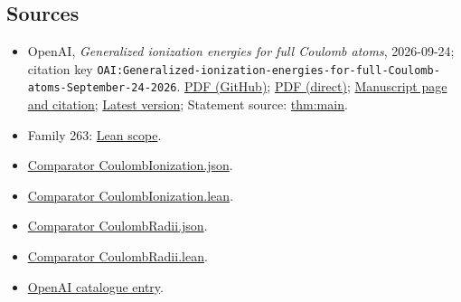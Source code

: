 \documentclass[11pt]{article}
\begin{document}
\subsection{Sources}
\begin{itemize}
\item OpenAI, \emph{Generalized ionization energies for full Coulomb atoms}, 2026-09-24; citation key \texttt{OAI:Generalized-ionization-energies-for-full-Coulomb-atoms-September-24-2026}. \href{https://github.com/openai/math/blob/adc7f1241b42e322a6451854ab7e4b4c146bf78a/preprints/Generalized-ionization-energies-for-full-Coulomb-atoms-September-24-2026/paper.pdf}{PDF (GitHub)}; \href{https://github.com/openai/math/raw/adc7f1241b42e322a6451854ab7e4b4c146bf78a/preprints/Generalized-ionization-energies-for-full-Coulomb-atoms-September-24-2026/paper.pdf}{PDF (direct)}; \href{https://github.com/openai/math/blob/adc7f1241b42e322a6451854ab7e4b4c146bf78a/preprints/Generalized-ionization-energies-for-full-Coulomb-atoms-September-24-2026/README.md}{Manuscript page and citation}; \href{https://github.com/openai/math/blob/main/preprints/Generalized-ionization-energies-for-full-Coulomb-atoms-September-24-2026/paper.pdf}{Latest version}; Statement source: \href{https://github.com/openai/math/blob/adc7f1241b42e322a6451854ab7e4b4c146bf78a/preprints/Generalized-ionization-energies-for-full-Coulomb-atoms-September-24-2026/build/sections/01-introduction.tex\#L78}{thm:main}.
\item Family 263: \href{https://github.com/openai/math/blob/adc7f1241b42e322a6451854ab7e4b4c146bf78a/lean/docs/263.md}{Lean scope}.
\item \href{https://github.com/openai/math/blob/adc7f1241b42e322a6451854ab7e4b4c146bf78a/lean/ComparatorChallenges/CoulombIonization.json}{Comparator CoulombIonization.json}.
\item \href{https://github.com/openai/math/blob/adc7f1241b42e322a6451854ab7e4b4c146bf78a/lean/ComparatorChallenges/CoulombIonization.lean}{Comparator CoulombIonization.lean}.
\item \href{https://github.com/openai/math/blob/adc7f1241b42e322a6451854ab7e4b4c146bf78a/lean/ComparatorChallenges/CoulombRadii.json}{Comparator CoulombRadii.json}.
\item \href{https://github.com/openai/math/blob/adc7f1241b42e322a6451854ab7e4b4c146bf78a/lean/ComparatorChallenges/CoulombRadii.lean}{Comparator CoulombRadii.lean}.
\item \href{https://github.com/openai/math/blob/adc7f1241b42e322a6451854ab7e4b4c146bf78a/CONTENTS.md}{OpenAI catalogue entry}.
\end{itemize}
\end{document}
